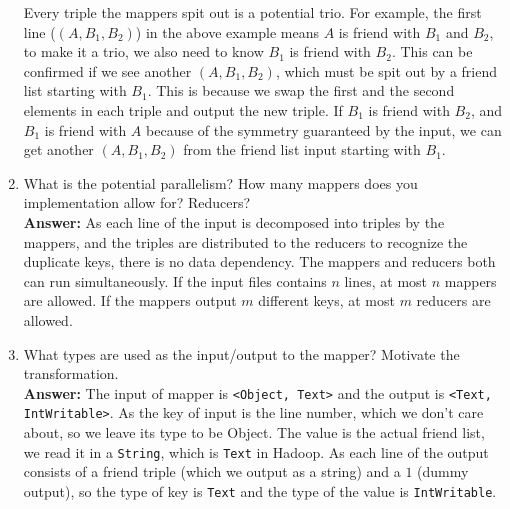 \documentclass[letterpaper, 11pt]{article}
\begin{document}
\begin{enumerate}
\begin{itemize}
    \end{itemize}
    Every triple the mappers spit out is a potential trio. For example, the first line ($(A, B_1, B_2)$) in the above example means $A$ is friend with $B_1$ and $B_2$, to make it a trio, we also need to know $B_1$ is friend with $B_2$. This can be confirmed if we see another $(A, B_1, B_2)$, which must be spit out by a friend list starting with $B_1$. This is because we swap the first and the second elements in each triple and output the new triple. If $B_1$ is friend with $B_2$,
    and $B_1$ is friend with $A$ because of the symmetry guaranteed by the input, we can get another $(A, B_1, B_2)$ from the friend list input starting with $B_1$.\\

    \item What is the potential parallelism? How many mappers does you implementation allow for? Reducers?\\
    \textbf{Answer:} As each line of the input is decomposed into triples by the mappers, and the triples are distributed to the reducers to recognize the duplicate keys, there is no data dependency. The mappers and reducers both can run simultaneously. If the input files contains $n$ lines, at most $n$ mappers are allowed. If the mappers output $m$ different keys, at most $m$ reducers are allowed.

    \item What types are used as the input/output to the mapper? Motivate the transformation.\\
        \textbf{Answer:} The input of mapper is \texttt{<Object, Text>} and the output is \texttt{<Text, IntWritable>}. As the key of input is the line number, which we don't care about, so we leave its type to be Object. The value is the actual friend list, we read it in a \texttt{String}, which is \texttt{Text} in Hadoop. As each line of the output consists of a friend triple (which we output as a string) and a $1$ (dummy output), so the type of key is \texttt{Text} and the type of the value is
        \texttt{IntWritable}.

\end{enumerate}
\end{document}
